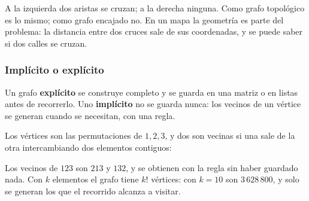 \documentclass[11pt,letterpaper]{article}
\begin{document}
\begin{center}
\end{center}

A la izquierda dos aristas se cruzan; a la derecha ninguna. Como grafo
topológico es lo mismo; como grafo encajado no. En un mapa la
geometría es parte del problema: la distancia entre dos cruces sale de
sus coordenadas, y se puede saber si dos calles se cruzan.

\subsubsection*{Implícito o explícito}

Un grafo \textbf{explícito} se construye completo y se guarda en una
matriz o en listas antes de recorrerlo. Uno \textbf{implícito} no se
guarda nunca: los vecinos de un vértice se generan cuando se
necesitan, con una regla.

\begin{ejemplo}
  Los vértices son las permutaciones de $1, 2, 3$, y dos son vecinas
  si una sale de la otra intercambiando dos elementos contiguos:
  \begin{center}
  \end{center}
  Los vecinos de $123$ son $213$ y $132$, y se obtienen con la regla
  sin haber guardado nada. Con $k$ elementos el grafo tiene $k!$
  vértices: con $k = 10$ son $3\,628\,800$, y solo se generan los que
  el recorrido alcanza a visitar.
\end{ejemplo}
\end{document}
